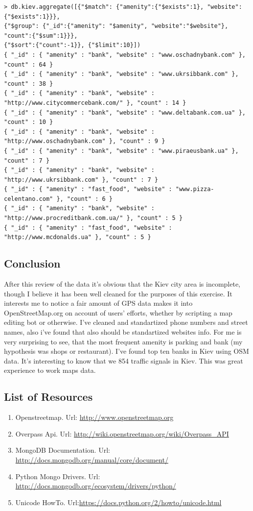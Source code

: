 \documentclass[a4paper,12pt]{article}
\begin{document}
\begin{lstlisting}[style=DOS]
> db.kiev.aggregate([{"$match": {"amenity":{"$exists":1}, "website":{"$exists":1}}}, 
{"$group": {"_id":{"amenity": "$amenity", "website":"$website"}, "count":{"$sum":1}}}, 
{"$sort":{"count":-1}}, {"$limit":10}])
{ "_id" : { "amenity" : "bank", "website" : "www.oschadnybank.com" }, "count" : 64 }
{ "_id" : { "amenity" : "bank", "website" : "www.ukrsibbank.com" }, "count" : 38 }
{ "_id" : { "amenity" : "bank", "website" : "http://www.citycommercebank.com/" }, "count" : 14 }
{ "_id" : { "amenity" : "bank", "website" : "www.deltabank.com.ua" }, "count" : 10 }
{ "_id" : { "amenity" : "bank", "website" : "http://www.oschadnybank.com" }, "count" : 9 }
{ "_id" : { "amenity" : "bank", "website" : "www.piraeusbank.ua" }, "count" : 7 }
{ "_id" : { "amenity" : "bank", "website" : "http://www.ukrsibbank.com" }, "count" : 7 }
{ "_id" : { "amenity" : "fast_food", "website" : "www.pizza-celentano.com" }, "count" : 6 }
{ "_id" : { "amenity" : "bank", "website" : "http://www.procreditbank.com.ua/" }, "count" : 5 }
{ "_id" : { "amenity" : "fast_food", "website" : "http://www.mcdonalds.ua" }, "count" : 5 }
\end{lstlisting}

\subsection*{Conclusion}
After this review of the data it’s obvious that the Kiev city area is incomplete, though I believe it has been well cleaned for the purposes of this exercise. It interests me to notice a fair amount of GPS data makes it into OpenStreetMap.org on account of users’ efforts, whether by scripting a map editing bot or otherwise. I've cleaned and standartized phone numbers and street names, also i've found that also should be standartized websites info. For me is very surprising to see, that the most frequent amenity is parking and bank (my hypothesis was shops or restaurant). I've found top ten banks in Kiev using OSM data. It's interesting to know that we 854 traffic signals in Kiev. This was great experience to work maps data.

\subsection*{List of Resources}
\begin{enumerate}
\item Openstreetmap. Url: \url{http://www.openstreetmap.org}
\item Overpass Api. Url: \url{http://wiki.openstreetmap.org/wiki/Overpass_API}
\item MongoDB Documentation. Url: \url{http://docs.mongodb.org/manual/core/document/}
\item Python Mongo Drivers. Url: \url{http://docs.mongodb.org/ecosystem/drivers/python/}
\item Unicode HowTo. Url:\url{https://docs.python.org/2/howto/unicode.html}
\end{enumerate}
\end{document}
